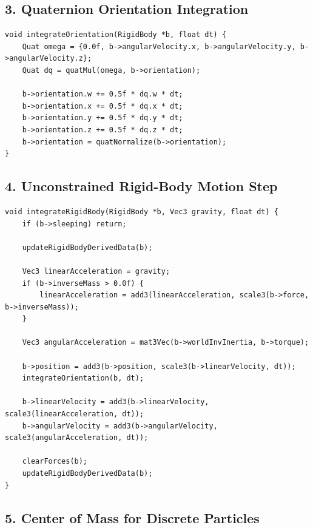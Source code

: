 \documentclass[10pt,letterpaper]{article}
\begin{document}
\subsection*{3. Quaternion Orientation Integration}

\begin{verbatim}
void integrateOrientation(RigidBody *b, float dt) {
    Quat omega = {0.0f, b->angularVelocity.x, b->angularVelocity.y, b->angularVelocity.z};
    Quat dq = quatMul(omega, b->orientation);

    b->orientation.w += 0.5f * dq.w * dt;
    b->orientation.x += 0.5f * dq.x * dt;
    b->orientation.y += 0.5f * dq.y * dt;
    b->orientation.z += 0.5f * dq.z * dt;
    b->orientation = quatNormalize(b->orientation);
}
\end{verbatim}

\subsection*{4. Unconstrained Rigid-Body Motion Step}

\begin{verbatim}
void integrateRigidBody(RigidBody *b, Vec3 gravity, float dt) {
    if (b->sleeping) return;

    updateRigidBodyDerivedData(b);

    Vec3 linearAcceleration = gravity;
    if (b->inverseMass > 0.0f) {
        linearAcceleration = add3(linearAcceleration, scale3(b->force, b->inverseMass));
    }

    Vec3 angularAcceleration = mat3Vec(b->worldInvInertia, b->torque);

    b->position = add3(b->position, scale3(b->linearVelocity, dt));
    integrateOrientation(b, dt);

    b->linearVelocity = add3(b->linearVelocity, scale3(linearAcceleration, dt));
    b->angularVelocity = add3(b->angularVelocity, scale3(angularAcceleration, dt));

    clearForces(b);
    updateRigidBodyDerivedData(b);
}
\end{verbatim}

\subsection*{5. Center of Mass for Discrete Particles}
\end{document}
